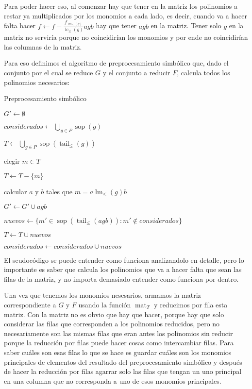 \documentclass[12pt]{report}
\theoremstyle{customstyle}
\theoremstyle{factstyle}
\DeclareMathOperator{\sop}{sop}
\DeclareMathOperator{\lm}{lm}
\DeclareMathOperator{\lc}{lc}
\DeclareMathOperator{\tail}{tail}
\DeclareMathOperator{\mat}{mat}
\begin{document}
Para poder hacer eso, al comenzar hay que tener en la matriz los polinomios a restar ya multiplicados por los monomios a cada lado, es decir, cuando va a hacer falta hacer $f ← f - \frac{f_{\lm_≤(g)}}{\lc_≤(g)}a g b$ hay que tener $agb$ en la matriz. Tener solo $g$ en la matriz no serviría porque no coincidirían los monomios y por ende no coincidirían las columnas de la matriz.

Para eso definimos el algoritmo de preprocesamiento simbólico que, dado el conjunto por el cual se reduce $G$ y el conjunto a reducir $F$, calcula todos los polinomios necesarios:

\begin{algorithm}[H] %
  \caption{Preprocesamiento simbólico}\label{alg:Preprocesamiento simbólico}
  $G' ← ∅$

  $considerados ← ⋃_{g ∈ P} \sop(g)$

  $T ← ⋃_{g ∈ P} \sop(\tail_≤(g))$

   {
    elegir $m ∈ T$

    $T ← T - \{m\}$

     {
      \If{$\lm_≤(g) | m$} {
        calcular $a$ y $b$ tales que $m = a \lm_≤(g) b$

        $G' ← G' ∪ {agb}$

        $nuevos ← \{m' ∈ \sop(\tail_≤(agb)) : m' ∉ considerados\}$

        $T ← T ∪ nuevos$

        $considerados ← considerados ∪ nuevos$
      }
    }
  }

\end{algorithm}

El seudocódigo se puede entender como funciona analizandolo en detalle, pero lo importante es saber que calcula los polinomios que va a hacer falta que sean las filas de la matriz, y no importa demasiado entender como funciona por dentro. %

Una vez que tenemos los monomios nesesarios, armamos la matriz correspondiente a $G$ y $F$ usando la función $\mat_T$ y reducimos por fila esta matriz. Con la matriz no es obvio que hay que hacer, porque hay que solo considerar las filas que corresponden a los polinomios reducidos, pero no necesariamente son las mismas filas que eran antes los polinomios sin reducir porque la reducción por filas puede hacer cosas como intercambiar filas. Para saber cuáles son esas filas lo que se hace es guardar cuáles son los monomios principales de elementos del resultado del preprocesamiento simbólico y después de hacer la reducción por filas agarrar solo las filas que tengan un uno principal en una columna que no corresponda a uno de esos monomios principales.
\end{document}
